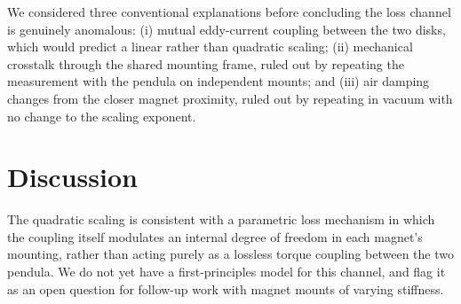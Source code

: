 \documentclass{article}
\begin{document}
We considered three conventional explanations before concluding the
loss channel is genuinely anomalous: (i) mutual eddy-current coupling
between the two disks, which would predict a linear rather than
quadratic scaling; (ii) mechanical crosstalk through the shared
mounting frame, ruled out by repeating the measurement with the
pendula on independent mounts; and (iii) air damping changes from the
closer magnet proximity, ruled out by repeating in vacuum with no
change to the scaling exponent.

\section{Discussion}

The quadratic scaling is consistent with a parametric loss mechanism
in which the coupling itself modulates an internal degree of freedom
in each magnet's mounting, rather than acting purely as a
lossless torque coupling between the two pendula. We do not yet have
a first-principles model for this channel, and flag it as an open
question for follow-up work with magnet mounts of varying stiffness.
\end{document}
